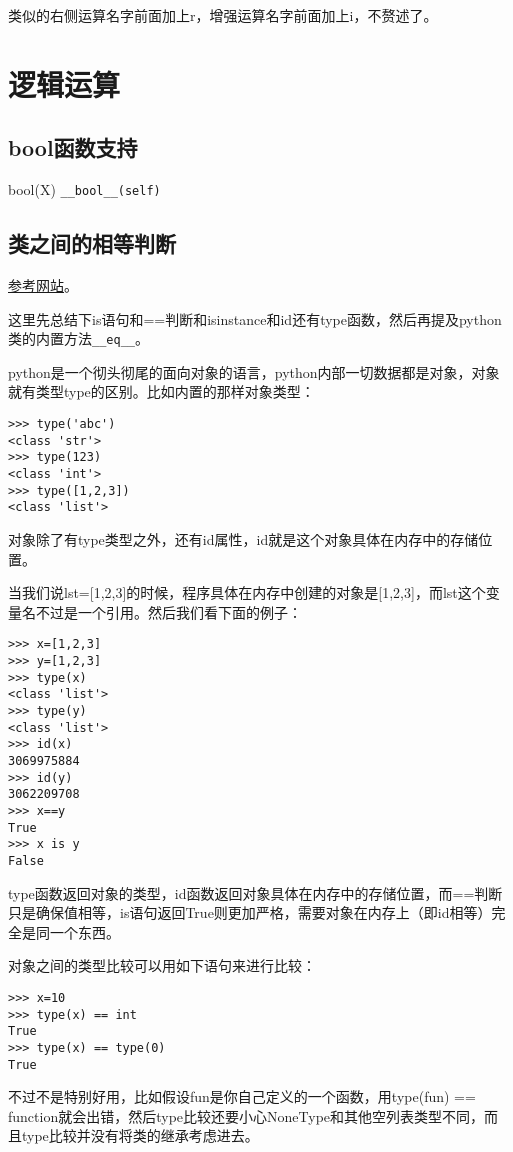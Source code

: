 \documentclass[12pt,oneside]{book}
\begin{document}
\begin{common-format}
类似的右侧运算名字前面加上r，增强运算名字前面加上i，不赘述了。


\section{逻辑运算}
\subsection{bool函数支持}
bool(X)  \verb+__bool__(self)+


\subsection{类之间的相等判断}
\href{http://www.informit.com/articles/article.aspx?p=453682}{参考网站}。

这里先总结下is语句和==判断和isinstance和id还有type函数，然后再提及python类的内置方法\verb+__eq__+。

python是一个彻头彻尾的面向对象的语言，python内部一切数据都是对象，对象就有类型type的区别。比如内置的那样对象类型：
\begin{Verbatim}
>>> type('abc')
<class 'str'>
>>> type(123)
<class 'int'>
>>> type([1,2,3])
<class 'list'>
\end{Verbatim}

对象除了有type类型之外，还有id属性，id就是这个对象具体在内存中的存储位置。

当我们说lst=[1,2,3]的时候，程序具体在内存中创建的对象是[1,2,3]，而lst这个变量名不过是一个引用。然后我们看下面的例子：
\begin{Verbatim}
>>> x=[1,2,3]
>>> y=[1,2,3]
>>> type(x)
<class 'list'>
>>> type(y)
<class 'list'>
>>> id(x)
3069975884
>>> id(y)
3062209708
>>> x==y
True
>>> x is y
False
\end{Verbatim}

type函数返回对象的类型，id函数返回对象具体在内存中的存储位置，而==判断只是确保值相等，is语句返回True则更加严格，需要对象在内存上（即id相等）完全是同一个东西。

对象之间的类型比较可以用如下语句来进行比较：
\begin{Verbatim}
>>> x=10
>>> type(x) == int
True
>>> type(x) == type(0)
True
\end{Verbatim}

不过不是特别好用，比如假设fun是你自己定义的一个函数，用type(fun) == function就会出错，然后type比较还要小心NoneType和其他空列表类型不同，而且type比较并没有将类的继承考虑进去。


\end{common-format}
\end{document}
